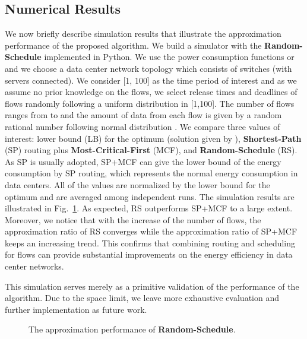 \documentclass[10pt, conference, compsocconf]{IEEEtran}
\begin{document}
\subsection{Numerical Results}

We now briefly describe simulation results that illustrate the approximation performance of the proposed algorithm. We build a simulator with the \textbf{Random-Schedule} implemented in Python. We use the power consumption functions  or  and we choose a data center network topology which consists of  switches (with  servers connected). We consider [1, 100] as the time period of interest and as we assume no prior knowledge on the flows, we select release times and deadlines of flows randomly following a uniform distribution in [1,100].
The number of flows ranges from  to  and the amount of data from each flow is given by a random rational number following normal distribution . We compare three values of interest: lower bound (LB) for the optimum (solution given by ), \textbf{Shortest-Path} (SP) routing plus \textbf{Most-Critical-First} (MCF), and \textbf{Random-Schedule} (RS). As SP is usually adopted, SP+MCF can give the lower bound of the energy consumption by SP routing, which represents the normal energy consumption in data centers. All of the values are normalized by the lower bound for the optimum and are averaged among  independent runs. The simulation results are illustrated in Fig.~\ref{fig:sim}. As expected, RS outperforms SP+MCF to a large extent. Moreover, we notice that with the increase of the number of flows, the approximation ratio of RS converges while the approximation ratio of SP+MCF keeps an increasing trend. This confirms that combining routing and scheduling for flows can provide substantial improvements on the energy efficiency in data center networks.

This simulation serves merely as a primitive validation of the performance of the algorithm. Due to the space limit, we leave more exhaustive evaluation and further implementation as future work.

\begin{figure}[!t]
	\centering
	\hspace{0in}
	\caption{The approximation performance of \textbf{Random-Schedule}.}
	\label{fig:sim} 
	\vspace{-0.45cm}
\end{figure}
\end{document}
